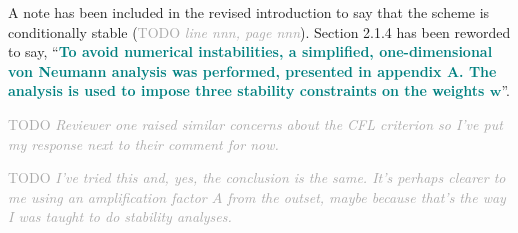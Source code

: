 \documentclass[times]{elsarticle}
\newcommand{\TODO}[1]{\textcolor{darkgray}{TODO \textit{#1}}}
\newcommand{\revtwo}[1]{\textcolor{teal}{\textbf{#1}}}
\begin{document}
\begin{quotation}
\begin{comment}
\item It is claimed in several places that the scheme is stable, but some qualification
is appropriate. First, the scheme is {\it conditionally} stable; the Courant number
should not be too large. Then Appendix~A gives an analysis deriving constraints
on the polynomial reconstruction that should be satisfied for stability. However,
the analysis is idealized in various ways: one-dimensional, regular grid, constant $v$,
two- and three-cell stencils, and ignoring the time discretization (also see below).
That is fair enough---it might not be possible to generalize the analysis to the full
scheme---and it is clearly stated at the end of the Appendix that the constraints are
{\it hypothesized} to apply more generally. However, in section 2.1.4 the language is
stronger and suggests that these constraints are definitive: ``...stability constraints...'',
``...must satisfy...'', etc.
\end{comment}
\end{quotation}
A note has been included in the revised introduction to say that the scheme is conditionally stable (\TODO{line nnn, page nnn}).
Section 2.1.4 has been reworded to say, ``\revtwo{To avoid numerical instabilities, a simplified, one-dimensional von Neumann analysis was performed, presented in appendix A.  The analysis is used to impose three stability constraints on the weights $\mathbf{w}$}''.

\begin{quotation}
\begin{comment}
\item P14. The calculation of the longest stable timestep {\it assumes} that the stability
limit is given by $\mathrm{Co}=1$. Given the idealized nature of the analysis in
Appendix~A, and that most experiments are done with $\mathrm{Co} \approx 0.4$,
at least some empirical investigation of the stability limit should be discussed
to confirm that it is indeed (exactly or approximately) $\mathrm{Co}=1$.
\end{comment}
\end{quotation}
\TODO{Reviewer one raised similar concerns about the CFL criterion so I've put my response next to their comment for now.}

\begin{quotation}
\begin{comment}
\item The presentation of the analysis in Appendix~A is somewhat confusing. It appears
to use a time discretization by introducing a time step $\Delta t$ and an amplification
factor $A$, (and hence a Courant number $v \Delta t / \Delta x$) whereas the
analysis is, in fact, continuous in time. It might be clearer to set
$\phi(x_j , t) = \hat{\phi}(t) \mathrm{e}^{i j k \Delta x}$ and form an ODE for
$\hat{\phi}$, etc. I think the conclusion would be the same.
\end{comment}
\end{quotation}
\TODO{I've tried this and, yes, the conclusion is the same.  It's perhaps clearer to me using an amplification factor $A$ from the outset, maybe because that's the way I was taught to do stability analyses.}
\end{document}
